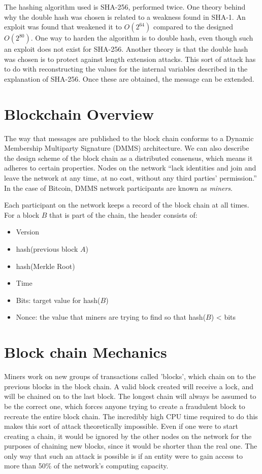 \documentclass[12pt]{article}
\begin{document}
The hashing algorithm used is SHA-256, performed twice. One theory behind why the double hash was chosen is related to a weakness found in SHA-1. An exploit was found that weakened it to $O(2^{64})$ compared to the designed $O(2^{80})$. One way to harden the algorithm is to double hash, even though such an exploit does not exist for SHA-256. Another theory is that the double hash was chosen is to protect against length extension attacks. This sort of attack has to do with reconstructing the values for the internal variables described in the explanation of SHA-256. Once these are obtained, the message can be extended.


\section{Blockchain Overview}

The way that messages are published to the block chain conforms to a Dynamic Membership Multiparty Signature (DMMS) architecture. We can also describe the design scheme of the block chain as a distributed consensus, which means it adheres to certain properties. Nodes on the network ``lack identities and  join and leave the network at any time, at no cost, without any third parties' permission.''
In the case of Bitcoin, DMMS network participants are known as \textit{miners}.

Each participant on the network keeps a record of the block chain at all times. For a block $B$ that is part of the chain, the header consists of:\begin{itemize}
\setlength\itemsep{.1em}
  \item Version
  \item hash(previous block $A$)
  \item hash(Merkle Root)
  \item Time
  \item Bits: target value for hash($B$)
  \item Nonce: the value that miners are trying to find so that hash($B$) < bits
\end{itemize}

\section{Block chain Mechanics}

Miners work on new groups of transactions called 'blocks', which chain on to the previous blocks in the block chain. A valid block created will receive a lock, and will be chained on to the last block. The longest chain will always be assumed to be the correct one, which forces anyone trying to create a fraudulent block to recreate the entire block chain. The incredibly high CPU time required to do this makes this sort of attack theoretically impossible. Even if one were to start creating a chain, it would be ignored by the other nodes on the network for the purposes of chaining new blocks, since it would be shorter than the real one. The only way that such an attack is possible is if an entity were to gain access to more than 50\% of the network's computing capacity.
\end{document}

